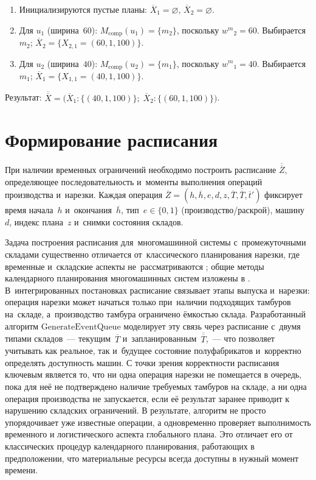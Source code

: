 \begin{enumerate}
\item Инициализируются пустые планы: $\overline{X}_1=\varnothing$, $\overline{X}_2=\varnothing$.
\item Для $u_1$ (ширина~$60$): $M_{\mathrm{comp}}(u_1)=\{m_2\}$, поскольку ${w^m}_2=60$. Выбирается $m_2$; $\overline{X}_2=\{X_{2,1}=(60,1,100)\}$.
\item Для $u_2$ (ширина~$40$): $M_{\mathrm{comp}}(u_2)=\{m_1\}$, поскольку ${w^m}_1=40$. Выбирается $m_1$; $\overline{X}_1=\{X_{1,1}=(40,1,100)\}$.
\end{enumerate}
Результат: $\overline{\overline{X}}=\bigl(\overline{X}_1:\{(40,1,100)\};\;\overline{X}_2:\{(60,1,100)\}\bigr)$.

\section{Формирование расписания}\label{sec:alg/schedule}

При наличии временных ограничений необходимо построить расписание $\overline{\overline{Z}}$, определяющее последовательность и~моменты выполнения операций производства и~нарезки.
Каждая операция $\overline{Z}=(h,\overline{h},e,d,z,\overline{T},\overline{\overline{T}},\overline{t}')$ фиксирует время начала~$h$ и~окончания~$\overline{h}$, тип~$e\in\{0,1\}$ (производство/раскрой), машину~$d$, индекс плана~$z$ и~снимки состояния складов.

Задача построения расписания для~многомашинной системы с~промежуточными складами существенно отличается от~классического планирования нарезки, где временные и~складские аспекты не~рассматриваются \cite{gilmore1961linear,haessler1991}; общие методы календарного планирования многомашинных систем изложены в \cite{pinedo2023_scheduling, brucker2007_scheduling_algorithms}.
В~интегрированных постановках \cite{keskinocak2002,nonas2000combined,westerlund1998trimloss_scheduling} расписание связывает этапы выпуска и~нарезки: операция нарезки может начаться только при~наличии подходящих тамбуров на~складе, а~производство тамбура ограничено ёмкостью склада.
Разработанный алгоритм $\mathrm{GenerateEventQueue}$ моделирует эту связь через расписание с~двумя типами складов~--- текущим~$\overline{T}$ и~запланированным~$\overline{\overline{T}}$,~--- что позволяет учитывать как реальное, так и~будущее состояние полуфабрикатов и~корректно определять доступность машин.
С точки зрения корректности расписания ключевым является то, что ни одна операция нарезки не помещается в очередь, пока для неё не подтверждено наличие требуемых тамбуров на складе, а ни одна операция производства не запускается, если её результат заранее приводит к нарушению складских ограничений. В результате, алгоритм не просто упорядочивает уже известные операции, а одновременно проверяет выполнимость временного и логистического аспекта глобального плана. Это отличает его от классических процедур календарного планирования, работающих в предположении, что материальные ресурсы всегда доступны в нужный момент времени.

